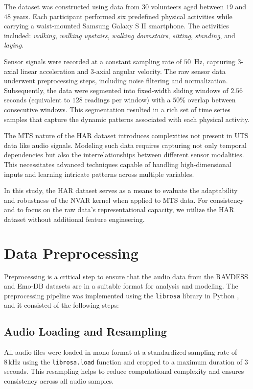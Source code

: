 The dataset was constructed using data from $30$ volunteers aged between $19$ and $48$ years. Each participant performed six predefined physical activities while carrying a waist-mounted Samsung Galaxy S $\text{II}$ smartphone. The activities included: \textit{walking}, \textit{walking upstairs}, \textit{walking downstairs}, \textit{sitting}, \textit{standing}, and \textit{laying}.

Sensor signals were recorded at a constant sampling rate of $50\,\text{ Hz}$, capturing $3$-axial linear acceleration and 3-axial angular velocity. The raw sensor data underwent preprocessing steps, including noise filtering and normalization. Subsequently, the data were segmented into fixed-width sliding windows of $2.56$ seconds (equivalent to $128$ readings per window) with a $50\%$ overlap between consecutive windows. This segmentation resulted in a rich set of time series samples that capture the dynamic patterns associated with each physical activity.

The MTS nature of the HAR dataset introduces complexities not present in UTS data like audio signals. Modeling such data requires capturing not only temporal dependencies but also the interrelationships between different sensor modalities. This necessitates advanced techniques capable of handling high-dimensional inputs and learning intricate patterns across multiple variables.

In this study, the HAR dataset serves as a means to evaluate the adaptability and robustness of the NVAR kernel when applied to MTS data. For consistency and to focus on the raw data's representational capacity, we utilize the HAR dataset without additional feature engineering.

\section{Data Preprocessing}

Preprocessing is a critical step to ensure that the audio data from the RAVDESS and Emo-DB datasets are in a suitable format for analysis and modeling. The preprocessing pipeline was implemented using the \texttt{librosa} library in Python \cite{librosa}, and it consisted of the following steps:

\subsection{Audio Loading and Resampling}

All audio files were loaded in mono format at a standardized sampling rate of $8\,\text{kHz}$ using the \texttt{librosa.load} function and cropped to a maximum duration of $3$ seconds. This resampling helps to reduce computational complexity and ensures consistency across all audio samples.

